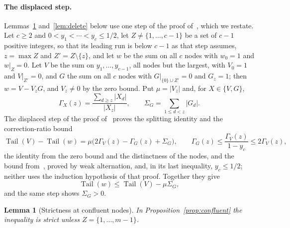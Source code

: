 \documentclass[11pt]{article}
\newtheorem{lemma}[theorem]{Lemma}
\theoremstyle{definition}
\theoremstyle{plain}
\DeclareMathOperator{\Tail}{Tail}
\begin{document}
\paragraph{The displaced step.}  Lemmas~\ref{lem:confstrict}
and~\ref{lem:delete} below use one step of the proof
of~\cite[Theorem~2.2]{coefficient-mass}, which we restate.  Let $c\ge2$ and
$0<y_1<\cdots<y_c\le1/2$, let $Z\ne\{1,\ldots,c-1\}$ be a set of $c-1$
positive integers, so that its leading run is below $c-1$ as that step
assumes, $z=\max Z$ and $Z'=Z\setminus\{z\}$, and let $w$ be the sum on all $c$
nodes with $w_0=1$ and $w|_Z=0$.  Let $V$ be the sum on
$y_1,\ldots,y_{c-1}$, all nodes but the largest, with $V_0=1$ and
$V|_{Z'}=0$, and $G$ the sum on all $c$ nodes with
$G|_{\{0\}\cup Z'}=0$ and $G_z=1$; then $w=V-V_zG$, and $V_z\ne0$ by the
zero bound.  Put $\mu=|V_z|$ and, for $X\in\{V,G\}$,
\[
  \Gamma_X(z)=\frac{\sum_{d\ge z}|X_d|}{|X_z|},
  \qquad \Sigma_G=\sum_{1\le d<z}|G_d| .
\]
The displaced step of the proof of~\cite[Theorem~2.2]{coefficient-mass}
proves the splitting identity and the correction-ratio bound
\[
  \Tail(V)-\Tail(w)=\mu\bigl(2\Gamma_V(z)-\Gamma_G(z)+\Sigma_G\bigr),
  \qquad
  \Gamma_G(z)\le\frac{\Gamma_V(z)}{1-y_c}\le2\Gamma_V(z),
\]
the identity from the zero bound and the distinctness of the nodes, and the
bound from~\cite[Lemma~2.3]{coefficient-mass}, proved by weak alternation,
and, in its last inequality, $y_c\le1/2$; neither uses the induction
hypothesis of that proof.
Together they give
\[
  \Tail(w)\le\Tail(V)-\mu\Sigma_G ,
\]
and the same step shows $\Sigma_G>0$.

\begin{lemma}[Strictness at confluent nodes]\label{lem:confstrict}
In Proposition~\ref{prop:confluent} the inequality is strict unless
$Z=\{1,\ldots,m-1\}$.
\end{lemma}
\end{document}
